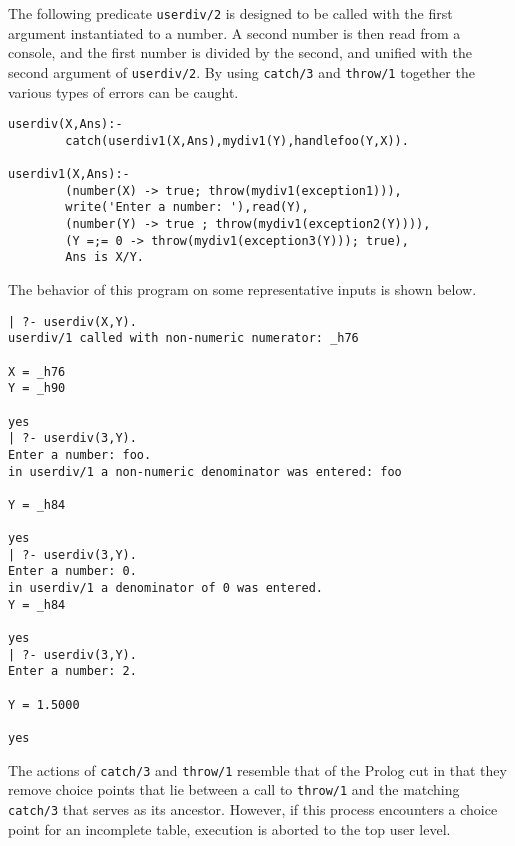 \begin{description}
The following predicate {\tt userdiv/2} is designed to be called with
the first argument instantiated to a number.  A second number is then
read from a console, and the first number is divided by the second,
and unified with the second argument of {\tt userdiv/2}.  By using
{\tt catch/3} and {\tt throw/1} together the various types of errors
can be caught.

\begin{small}
\begin{verbatim}
userdiv(X,Ans):- 
        catch(userdiv1(X,Ans),mydiv1(Y),handlefoo(Y,X)).

userdiv1(X,Ans):- 
        (number(X) -> true; throw(mydiv1(exception1))),
        write('Enter a number: '),read(Y),
        (number(Y) -> true ; throw(mydiv1(exception2(Y)))),
        (Y =;= 0 -> throw(mydiv1(exception3(Y))); true),
        Ans is X/Y.
\end{verbatim}
\end{small}

The behavior of this program on some representative inputs is shown
below.

\begin{small}
\begin{verbatim}
| ?- userdiv(X,Y).
userdiv/1 called with non-numeric numerator: _h76

X = _h76
Y = _h90

yes
| ?- userdiv(3,Y).
Enter a number: foo.
in userdiv/1 a non-numeric denominator was entered: foo

Y = _h84

yes
| ?- userdiv(3,Y).
Enter a number: 0.
in userdiv/1 a denominator of 0 was entered.
Y = _h84

yes
| ?- userdiv(3,Y).
Enter a number: 2.

Y = 1.5000

yes
\end{verbatim}
\end{small}

The actions of {\tt catch/3} and {\tt throw/1} resemble that of the
Prolog cut in that they remove choice points that lie between a call
to {\tt throw/1} and the matching {\tt catch/3} that serves as its
ancestor.  However, if this process encounters a choice point for an
incomplete table, execution is aborted to the top user level.

\end{description}



